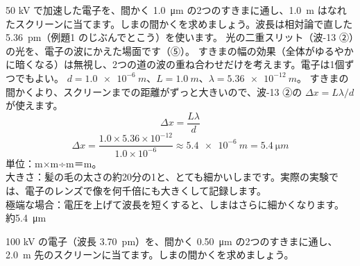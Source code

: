 \label{ph:原-3:ex6}
\begin{phreidai}[電子の二重スリットのしま]
50 kV で加速した電子を、間かく \qty{1.0}{\micro m} の2つのすきまに通し、\qty{1.0}{m} はなれたスクリーンに当てます。しまの間かくを求めましょう。波長は相対論で直した \qty{5.36}{pm}（例題1 のじぶんでとこう）を使います。
\phbamen
光の二重スリット（波-13 ②）の光を、電子の波にかえた場面です（⑤）。
\phmushi
すきまの幅の効果（全体がゆるやかに暗くなる）は無視し、2つの道の波の重ね合わせだけを考えます。電子は1個ずつでもよい。
\phzu
$d=\qty{1.0e-6}{m}$、$L=\qty{1.0}{m}$、$\lambda=\qty{5.36e-12}{m}$。
\phriyu
すきまの間かくより、スクリーンまでの距離がずっと大きいので、波-13 ②の $\Delta x=L\lambda/d$ が使えます。
\phtateru
\[ \Delta x=\frac{L\lambda}{d} \]
\phtoku
\[ \Delta x=\frac{1.0\times5.36\times10^{-12}}{1.0\times10^{-6}}\approx\qty{5.4e-6}{m}=\qty{5.4}{\micro m} \]
\phtashikame
単位：m×m÷m＝m。\\
大きさ：髪の毛の太さの約20分の1と、とても細かいしまです。実際の実験では、電子のレンズで像を何千倍にも大きくして記録します。\\
極端な場合：電圧を上げて波長を短くすると、しまはさらに細かくなります。
\kotae 約\qty{5.4}{\micro m}
\end{phreidai}
\begin{jibun}
100 kV の電子（波長 \qty{3.70}{pm}）を、間かく \qty{0.50}{\micro m} の2つのすきまに通し、\qty{2.0}{m} 先のスクリーンに当てます。しまの間かくを求めましょう。
\end{jibun}

